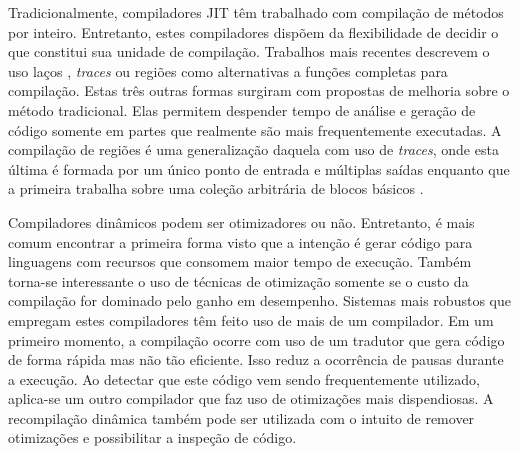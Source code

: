 Tradicionalmente, compiladores JIT têm trabalhado com compilação de métodos
por inteiro. Entretanto, estes compiladores
dispõem da flexibilidade de decidir o que constitui sua
unidade de compilação. Trabalhos mais recentes descrevem o uso laços
\cite{jitcompunits}, \textit{traces}
\cite{jitcompunits} ou regiões \cite{regionunit} como alternativas a
funções completas para compilação. Estas três outras formas surgiram
com propostas de melhoria \cite{regionunit}\cite{jitcompunits} sobre o
método tradicional. Elas permitem
despender tempo de análise e geração de código somente em partes que
realmente são mais
frequentemente executadas. A compilação de regiões é uma generalização
daquela com uso de \textit{traces}, onde esta última é formada
por um único ponto de entrada e múltiplas saídas \cite{jitcompunits}
enquanto que a primeira trabalha sobre uma coleção arbitrária de
blocos básicos \cite{dragonbook}.

Compiladores dinâmicos podem ser otimizadores ou não. Entretanto, é
mais comum encontrar a primeira forma visto que a intenção é gerar
código para linguagens com recursos que consomem maior tempo de
execução. Também torna-se interessante o uso de técnicas de otimização somente
se o custo da compilação for dominado pelo ganho em desempenho.
 Sistemas mais robustos \cite{holzle}\cite{judo}\cite{suganuma_ibm}
que empregam estes compiladores têm feito uso de mais de um
compilador. Em um primeiro momento, a compilação ocorre com uso de um
tradutor que gera código de forma rápida mas não tão eficiente. Isso
reduz a ocorrência de pausas durante a execução. Ao
detectar que este código vem sendo frequentemente utilizado,
aplica-se um outro compilador que faz uso de otimizações mais
dispendiosas. A recompilação dinâmica \cite{holzle} também pode ser
utilizada com o intuito de remover otimizações e possibilitar a inspeção
de código.




